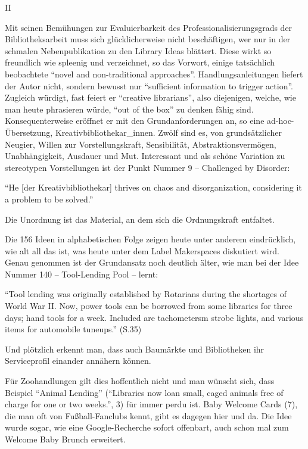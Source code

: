 \documentclass[a4paper,
fontsize=11pt,
oneside,
numbers=noperiodatend,
parskip=half-,
bibliography=totoc,
final
]{scrartcl}
\begin{document}
II

Mit seinen Bemühungen zur Evaluierbarkeit des Professionalisierungsgrads
der Bibliotheksarbeit muss sich glücklicherweise nicht beschäftigen, wer
nur in der schmalen Nebenpublikation zu den Library Ideas blättert.
Diese wirkt so freundlich wie spleenig und verzeichnet, so das Vorwort,
einige tatsächlich beobachtete \enquote{novel and non-traditional
approaches}. Handlungsanleitungen liefert der Autor nicht, sondern
bewusst nur \enquote{sufficient information to trigger action}. Zugleich
würdigt, fast feiert er \enquote{creative librarians}, also diejenigen,
welche, wie man heute phrasieren würde, \enquote{out of the box} zu
denken fähig sind. Konsequenterweise eröffnet er mit den
Grundanforderungen an, so eine ad-hoc-Übersetzung,
Kreativbibliothekar\_innen. Zwölf sind es, von grundsätzlicher Neugier,
Willen zur Vorstellungskraft, Sensibilität, Abstraktionsvermögen,
Unabhängigkeit, Ausdauer und Mut. Interessant und als schöne Variation
zu stereotypen Vorstellungen ist der Punkt Nummer 9 -- Challenged by
Disorder:

\enquote{He {[}der Kreativbibliothekar{]} thrives on chaos and
disorganization, considering it a problem to be solved.}

Die Unordnung ist das Material, an dem sich die Ordnungskraft entfaltet.

Die 156 Ideen in alphabetischen Folge zeigen heute unter anderem
eindrücklich, wie alt all das ist, was heute unter dem Label Makerspaces
diskutiert wird. Genau genommen ist der Grundansatz noch deutlich älter,
wie man bei der Idee Nummer 140 -- Tool-Lending Pool -- lernt:

\enquote{Tool lending was originally established by Rotarians during the
shortages of World War II. Now, power tools can be borrowed from some
libraries for three days; hand tools for a week. Included are
tachometersm strobe lights, and various items for automobile tuneups.}
(S.35)

Und plötzlich erkennt man, dass auch Baumärkte und Bibliotheken ihr
Serviceprofil einander annähern können.

Für Zoohandlungen gilt dies hoffentlich nicht und man wünscht sich, dass
Beispiel \enquote{Animal Lending} (\enquote{Libraries now loan small,
caged animals free of charge for one or two weeks.}, 3) für immer perdu
ist. Baby Welcome Cards (7), die man oft von Fußball-Fanclubs kennt,
gibt es dagegen hier und da. Die Idee wurde sogar, wie eine
Google-Recherche sofort offenbart, auch schon mal zum Welcome Baby
Brunch erweitert.
\end{document}

